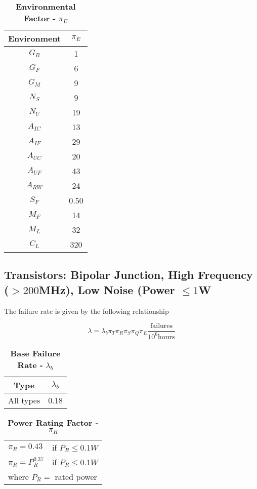 \begin{table}[h]
\caption{\textbf{Environmental Factor -} $\pi_{E}$}
\label{table:enviroFactorTranSlow}
\begin{tabular}{|c|c|} \hline
\rowcolor{Gray}
\textbf{Environment} & $\pi_{E}$ \\ \hline
$G_{B}$ & 1 \\ \hline
$G_{F}$ & 6 \\ \hline
$G_{M}$ & 9 \\ \hline
$N_{S}$ & 9 \\ \hline
$N_{U}$ & 19 \\ \hline
$A_{IC}$ & 13 \\ \hline
$A_{IF}$ & 29 \\ \hline
$A_{UC}$ & 20 \\ \hline
$A_{UF}$ & 43 \\ \hline
$A_{RW}$ & 24 \\ \hline
$S_{F}$ & 0.50 \\ \hline
$M_{F}$ & 14 \\ \hline
$M_{L}$ & 32 \\ \hline
$C_{L}$ & 320 \\ \hline
\end{tabular}
\end{table}

\newpage

\subsection{Transistors: Bipolar Junction, High Frequency ($> 200$MHz), Low Noise (Power $\leq 1$W}
\label{subsection:transistors-bipolar-junction-high-frequency-200mhz-low-noise-power-1w}

The failure rate is given by the following relationship

$$\lambda = \lambda_{b} \pi_{T} \pi_{R} \pi_{S} \pi_{Q} \pi_{E} \frac{\text{failures}}{10^{6} \text{hours}}$$

\begin{table}[h]
\caption{\textbf{Base Failure Rate -} $\lambda_{b}$}
\label{table:baseFaileRateBjtHigh}
\begin{tabular}{|c|c|} \hline
\rowcolor{Gray}
\textbf{Type} & $\lambda_{b}$ \\ \hline
All types & 0.18 \\ \hline
\end{tabular}
\end{table}

\begin{table}[h]
\caption{\textbf{Power Rating Factor -} $\pi_{R}$}
\label{table:powerRateFactorBjtHigh}
\begin{tabular}{ll} 
$\pi_{R} = 0.43$ 			& if $P_{R} \leq 0.1W$ \\
$\pi_{R} = P^{0.37}_{R}$ 	& if $P_{R} \leq 0.1W$ \\
\multicolumn{2}{l}{where $P_{R} = $ rated power }  \\ 
\end{tabular}
\end{table}

